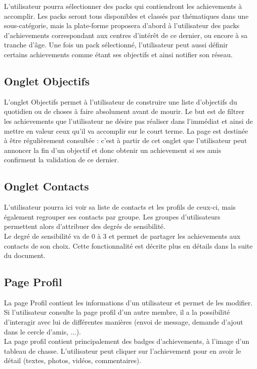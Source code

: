 \documentclass{life-fr}
\begin{document}
L'utilisateur pourra sélectionner des packs qui contiendront les achievements à accomplir. Les packs seront tous disponibles et classés par thématiques dans une sous-catégorie, mais la plate-forme proposera d'abord à l'utilisateur des packs d'achievements correspondant aux centres d'intérêt de ce dernier, ou encore à sa tranche d'âge. Une fois un pack sélectionné, l'utilisateur peut aussi définir certains achievements comme étant ses objectifs et ainsi notifier son réseau.

\subsection{Onglet Objectifs}

L'onglet Objectifs permet à l'utilisateur de construire une liste d'objectifs du quotidien ou de choses à faire absolument avant de mourir. Le but est de filtrer les achievements que l'utilisateur ne désire pas réaliser dans l'immédiat et ainsi de mettre en valeur ceux qu'il va accomplir sur le court terme. La page est destinée à être régulièrement consultée : c'est à partir de cet onglet que l'utilisateur peut annoncer la fin d'un objectif et donc obtenir un achievement si ses amis confirment la validation de ce dernier.

\subsection{Onglet Contacts}

L'utilisateur pourra ici voir sa liste de contacts et les profils de ceux-ci, mais également regrouper ses contacts par groupe. Les groupes d'utilisateurs permettent alors d'attribuer des degrés de sensibilité.\\
Le degré de sensibilité va de 0 à 3 et permet de partager les achievements aux contacts de son choix. Cette fonctionnalité est décrite plus en détails dans la suite du document.

\subsection{Page Profil}

La page Profil contient les informations d'un utilisateur et permet de les modifier. Si l'utilisateur consulte la page profil d'un autre membre, il a la possibilité d'interagir avec lui de différentes manières (envoi de message, demande d'ajout dans le cercle d'amis, ...).\\
La page profil contient principalement des badges d'achievements, à l'image d'un tableau de chasse. L'utilisateur peut cliquer sur l'achievement pour en avoir le détail (textes, photos, vidéos, commentaires).
\end{document}
